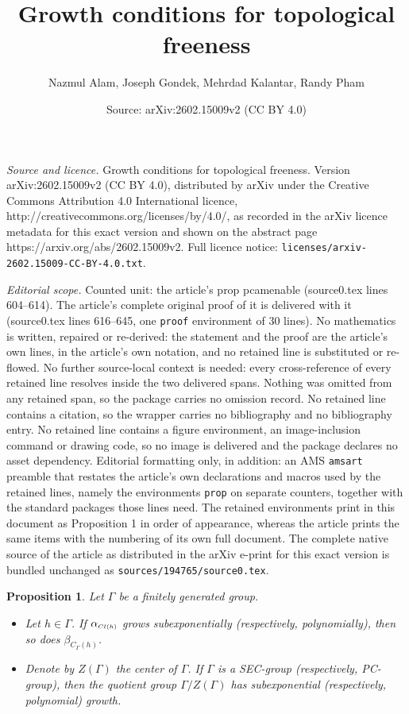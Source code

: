 \documentclass[10pt,a4paper]{amsart}
\title{Growth conditions for topological freeness}
\author{Nazmul Alam, Joseph Gondek, Mehrdad Kalantar, Randy Pham}
\date{Source: arXiv:2602.15009v2 (CC BY 4.0)}
\newtheorem{prop}{Proposition}
\newcommand{\G}{\Gamma}
\begin{document}
\maketitle

\noindent\emph{Source and licence.} Growth conditions for topological freeness. Version arXiv:2602.15009v2 (CC BY 4.0), distributed by arXiv under the Creative Commons Attribution 4.0 International licence, http://creativecommons.org/licenses/by/4.0/, as recorded in the arXiv licence metadata for this exact version and shown on the abstract page https://arxiv.org/abs/2602.15009v2. Full licence notice: \texttt{licenses/arxiv-2602.15009-CC-BY-4.0.txt}.\par\smallskip

\noindent\textit{Editorial scope.} Counted unit: the article's prop pcamenable (source0.tex lines 604--614). The article's complete original proof of it is delivered with it (source0.tex lines 616--645, one \texttt{proof} environment of 30 lines). No mathematics is written, repaired or re-derived: the statement and the proof are the article's own lines, in the article's own notation, and no retained line is substituted or re-flowed.  No further source-local context is needed: every cross-reference of every retained line resolves inside the two delivered spans.  Nothing was omitted from any retained span, so the package carries no omission record.  No retained line contains a citation, so the wrapper carries no bibliography and no bibliography entry.  No retained line contains a figure environment, an image-inclusion command or drawing code, so no image is delivered and the package declares no asset dependency.  Editorial formatting only, in addition: an AMS \texttt{amsart} preamble that restates the article's own declarations and macros used by the retained lines, namely the environments \texttt{prop} on separate counters, together with the standard packages those lines need.  The retained environments print in this document as Proposition 1 in order of appearance, whereas the article prints the same items with the numbering of its own full document.  The complete native source of the article as distributed in the arXiv e-print for this exact version is bundled unchanged as \texttt{sources/194765/source0.tex}.
\begin{prop}\label{pcamenable}
Let $\G$ be a finitely generated group. 
\begin{itemize}
\item[(i)]
Let $h\in\G$. If 
$\alpha_{\scriptscriptstyle{\rm Cl}(h)}$ grows subexponentially \textup{(}respectively, polynomially\textup{)}, then so does $\beta_{\scriptscriptstyle C_\G(h)}$.
\item[(ii)]
Denote by $Z(\Gamma)$ the center of $\G$.
If $\G$ is a SEC-group \textup{(}respectively, PC-group\textup{)}, then the quotient group $\G/Z(\G)$ has subexponential \textup{(}respectively, polynomial\textup{)} growth.
\end{itemize}
\end{prop}
\end{document}
